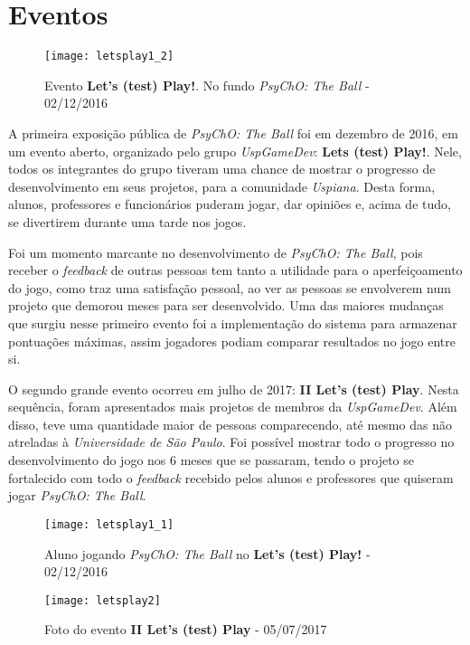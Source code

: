 \section{Eventos}
\label{sec:eventos}


\begin{figure}[h]
\texttt{[image: letsplay1\_2]}
\centering
\caption{Evento \textbf{Let's (test) Play!}. No fundo \textit{PsyChO: The Ball} - 02/12/2016}
\end{figure}

A primeira exposição pública de \textit{PsyChO: The Ball} foi em dezembro de 2016, em um evento aberto, organizado pelo grupo \textit{UspGameDev}: \textbf{Lets (test) Play!}. Nele, todos os integrantes do grupo tiveram uma chance de mostrar o progresso de desenvolvimento em seus projetos, para a comunidade \textit{Uspiana}. Desta forma, alunos, professores e funcionários puderam jogar, dar opiniões e, acima de tudo, se divertirem durante uma tarde nos jogos.

Foi um momento marcante no desenvolvimento de \textit{PsyChO: The Ball}, pois receber o \textit{feedback} de outras pessoas tem tanto a utilidade para o aperfeiçoamento do jogo, como traz uma satisfação pessoal, ao ver as pessoas se envolverem num projeto que demorou meses para ser desenvolvido. Uma das maiores mudanças que surgiu nesse primeiro evento foi a implementação do sistema para armazenar pontuações máximas, assim jogadores podiam comparar resultados no jogo entre si.

O segundo grande evento ocorreu em julho de 2017: \textbf{II Let's (test) Play}. Nesta sequência, foram apresentados mais projetos de membros da \textit{UspGameDev}. Além disso, teve uma quantidade maior de pessoas comparecendo, até mesmo das não atreladas à \textit{Universidade de São Paulo}. Foi possível mostrar todo o progresso no desenvolvimento do jogo nos 6 meses que se passaram, tendo o projeto se fortalecido com todo o \textit{feedback} recebido pelos alunos e professores que quiseram jogar \textit{PsyChO: The Ball}.

\begin{figure}[h!]
  \texttt{[image: letsplay1\_1]}
  \centering
  \caption{Aluno jogando \textit{PsyChO: The Ball} no \textbf{Let's (test) Play!} - 02/12/2016}
\end{figure}

\begin{figure}[h]
\texttt{[image: letsplay2]}
\centering
\caption{Foto do evento \textbf{II Let's (test) Play} - 05/07/2017}
\end{figure}

